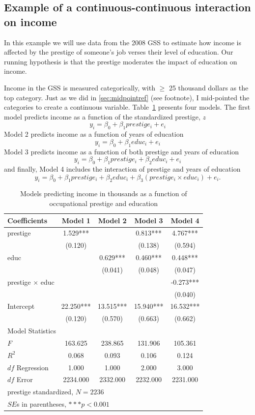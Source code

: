\subsection{Example of a continuous-continuous interaction on income}

In this example we will use data from the 2008 GSS to estimate how income is affected by the prestige of someone's job verses their level of education. Our running hypothesis is that the prestige moderates the impact of education on income.

Income in the GSS is measured categorically, with $\geq$ 25 thousand dollars as the top category. Just as we did in \ref{sec:midpointref} (see footnote), I mid-pointed the categories to create a continuous variable. Table~\ref{tab:incomeprestige} presents four models. The first model predicts income as a function of the standardized prestige, $z$
\[
y_i=\beta_0+\beta_1prestige_i+e_i
\]
Model 2 predicts income as a function of years of education
\[
y_i=\beta_0+\beta_1educ_i+e_i
\]
Model 3 predicts income as a function of both prestige and years of education
\[
y_i=\beta_0+\beta_1prestige_i+\beta_2educ_i+e_i
\]
and finally, Model 4 includes the interaction of prestige and years of education
\[
y_i=\beta_0+\beta_1prestige_i+\beta_2educ_i+\beta_3\left(prestige_i\times educ_i\right)+e_i.
\]
\begin{table}[htbp]\centering
\caption{Models predicting income in thousands as a function of occupational prestige and education
\label{tab:incomeprestige}}
\begin{tabular}{lcccc}
\hline
Coefficients&Model 1&Model 2&Model 3&Model 4 \\
\hline
prestige  &    1.529***&        &    0.813***&    4.767***\\
      &   (0.120)  &        &   (0.138)  &   (0.594)  \\
educ    &        &    0.629***&    0.460***&    0.448***\\
      &        &   (0.041)  &   (0.048)  &   (0.047)  \\
prestige $\times$ educ &        &        &        &   -0.273***\\
      &        &        &        &   (0.040)  \\
Intercept    &   22.250***&   13.515***&   15.940***&   16.532***\\
      &   (0.120)  &   (0.570)  &   (0.663)  &   (0.662)  \\
\hline
\multicolumn{5}{l}{Model Statistics} \\
\hline
$F$   &   163.625  &   238.865  &   131.906  &   105.361  \\
$R^2$  &    0.068  &    0.093  &    0.106  &    0.124  \\
$df$ Regression 			 &    1.000  &    1.000  &    2.000  &    3.000  \\
$df$ Error 					  &  2234.000  &  2332.000  &  2232.000  &  2231.000  \\
\hline
\multicolumn{5}{l}{prestige standardized, $N= 2236$} \\
\multicolumn{5}{l}{$SE$s in parentheses, $***p<0.001$}
{\footnotesize{\emph{Source: GSS 2008}}} \\
\hline
\end{tabular}
\end{table}
